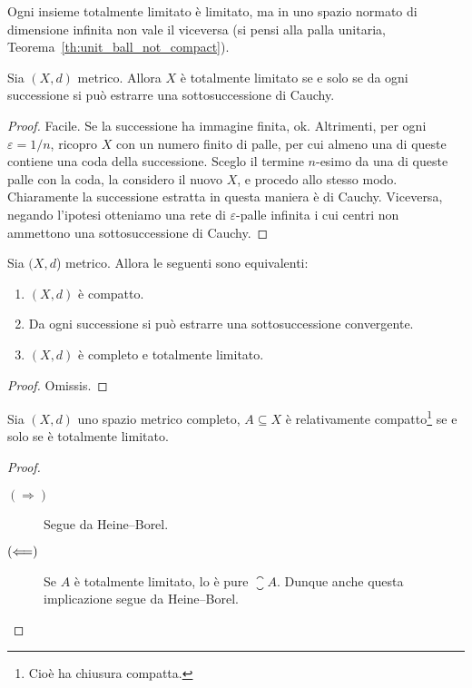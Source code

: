 \begin{remark}
	Ogni insieme totalmente limitato è limitato, ma in uno spazio normato di dimensione infinita non vale il viceversa (si pensi alla palla unitaria, Teorema~\ref{th:unit_ball_not_compact}).
\end{remark}

\begin{lemma}
	Sia $(X,d)$ metrico.
	Allora $X$ è totalmente limitato se e solo se da ogni successione si può estrarre una sottosuccessione di Cauchy.
\end{lemma}
\begin{proof}
	Facile. Se la successione ha immagine finita, ok. Altrimenti, per ogni $\varepsilon = 1/n$, ricopro $X$ con un numero finito di palle, per cui almeno una di queste contiene una coda della successione.
	Sceglo il termine $n$-esimo da una di queste palle con la coda, la considero il nuovo $X$, e procedo allo stesso modo.
	Chiaramente la successione estratta in questa maniera è di Cauchy.
	Viceversa, negando l'ipotesi otteniamo una rete di $\varepsilon$-palle infinita i cui centri non ammettono una sottosuccessione di Cauchy.
\end{proof}

\begin{theorem}
\label{th:heine_borel}
	Sia $(X,d$) metrico. Allora le seguenti sono equivalenti:
	\begin{enumerate}
		\item $(X,d)$ è compatto.
		\item Da ogni successione si può estrarre una sottosuccessione convergente.
		\item $(X,d)$ è completo e totalmente limitato.
	\end{enumerate}
\end{theorem}
\begin{proof}
	Omissis.
\end{proof}

\begin{corollary}
	Sia $(X,d)$ uno spazio metrico completo, $A \subseteq X$ è relativamente compatto\footnote{Cioè ha chiusura compatta.} se e solo se è totalmente limitato.
\end{corollary}
\begin{proof}
	\leavevmode
	\begin{description}
		\item[$(\Longrightarrow)$] Segue da Heine--Borel.
		\item[$(\Longleftarrow)$] Se $A$ è totalmente limitato, lo è pure $\closure A$. Dunque anche questa implicazione segue da Heine--Borel.
	\end{description}
\end{proof}

